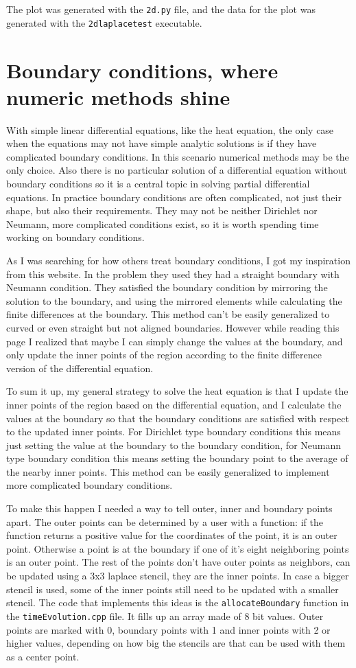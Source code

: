 \documentclass[pdftex,12pt,a4paper]{article}
\begin{document}
		The plot was generated with the \texttt{2d.py} file, and the data for the plot was generated with the \texttt{2dlaplacetest} executable.
	\section{Boundary conditions, where numeric methods shine}
		With simple linear differential equations, like the heat equation, the only case when the equations may not have simple analytic solutions is if they have complicated boundary conditions. In this scenario numerical methods may be the only choice. Also there is no particular solution of a differential equation without boundary conditions so it is a central topic in solving partial differential equations. In practice boundary conditions are often complicated, not just their shape, but also their requirements. They may not be neither Dirichlet nor Neumann, more complicated conditions exist, so it is worth spending time working on boundary conditions.
		
		As I was searching for how others treat boundary conditions, I got my inspiration from this website. \cite{lectureNotes} In the problem they used they had a straight boundary with Neumann condition. They satisfied the boundary condition by mirroring the solution to the boundary, and using the mirrored elements while calculating the finite differences at the boundary. This method can't be easily generalized to curved or even straight but not aligned boundaries. However while reading this page I realized that maybe I can simply change the values at the boundary, and only update the inner points of the region according to the finite difference version of the differential equation.
		
		To sum it up, my general strategy to solve the heat equation is that I update the inner points of the region based on the differential equation, and I calculate the values at the boundary so that the boundary conditions are satisfied with respect to the updated inner points. For Dirichlet type boundary conditions this means just setting the value at the boundary to the boundary condition, for Neumann type boundary condition this means setting the boundary point to the average of the nearby inner points. This method can be easily generalized to implement more complicated boundary conditions.
		
		To make this happen I needed a way to tell outer, inner and boundary points apart. The outer points can be determined by a user with a function: if the function returns a positive value for the coordinates of the point, it is an outer point. Otherwise a point is at the boundary if one of it's eight neighboring points is an outer point. The rest of the points don't have outer points as neighbors, can be updated using a 3x3 laplace stencil, they are the inner points. In case a bigger stencil is used, some of the inner points still need to be updated with a smaller stencil. The code that implements this ideas is the \texttt{allocateBoundary} function in the \texttt{timeEvolution.cpp} file. It fills up an array made of 8 bit values. Outer points are marked with 0, boundary points with 1 and inner points with 2 or higher values, depending on how big the stencils are that can be used with them as a center point.
\end{document}
